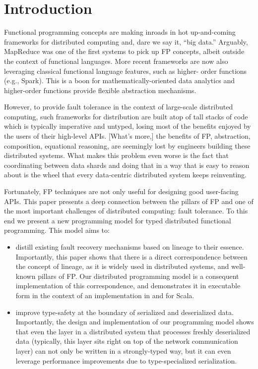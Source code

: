 \documentclass[preprint]{sigplanconf}
\theoremstyle{definition}
\theoremstyle{definition}
\begin{document}
\section{Introduction}


Functional programming concepts are making inroads in hot up-and-coming
frameworks for distributed computing and, dare we say it, ``big data.''
Arguably, MapReduce was one of the first systems to pick up FP concepts,
albeit outside the context of functional languages. More recent frameworks are
now also leveraging classical functional language features, such as higher-
order functions (e.g., Spark). This is a boon for mathematically-oriented data
analytics and higher-order functions provide flexible abstraction mechanisms.

However, to provide fault tolerance in the context of large-scale distributed
computing, such frameworks for distribution are built atop of tall stacks of
code which is typically imperative and untyped, losing most of the benefits
enjoyed by the users of their high-level APIs. [What's more,] the benefits of
FP, abstraction, composition, equational reasoning, are seemingly lost by
engineers building these distributed systems. What makes this problem even
worse is the fact that coordinating between data shards and doing that in a
way that is easy to reason about is the wheel that every data-centric
distributed system keeps reinventing.

Fortunately, FP techniques are not only useful for designing good user-facing
APIs. This paper presents a deep connection between the pillars of FP and one
of the most important challenges of distributed computing: fault tolerance. To
this end we present a new programming model for typed distributed functional
programming. This model aims to:

\begin{itemize}
\item distill existing fault recovery mechanisms based on lineage to their essence.
Importantly, this paper shows that there is a direct correspondence between
the concept of lineage, as it is widely used in distributed systems, and well-known
pillars of FP. Our distributed programming model is a consequent
implementation of this correspondence, and demonstrates it in executable form
in the context of an implementation in and for Scala.

\item improve type-safety at the boundary of serialized and deserialized data.
Importantly, the design and implementation of our programming model shows that
even the layer in a distributed system that processes freshly deserialized
data (typically, this layer sits right on top of the network communication
layer) can not only be written in a strongly-typed way, but it can even
leverage performance improvements due to type-specialized serialization.
\end{itemize}
\end{document}
